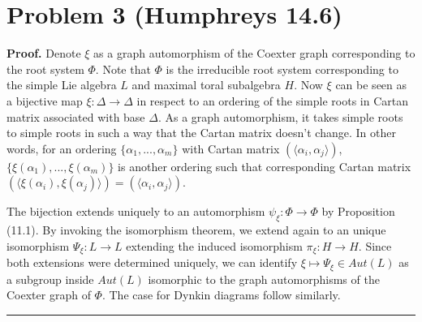 \documentclass[12pt]{article}%
\newenvironment{proof}[1][Proof]{\textbf{#1.} }{\ \rule{0.5em}{0.5em}}
\begin{document}
\section*{Problem 3 (Humphreys 14.6)}
\begin{proof}
  Denote $\xi$ as a graph automorphism of the Coexter graph corresponding to the root system $\Phi$. Note that $\Phi$ is the irreducible root system corresponding to the simple Lie algebra $L$ and maximal toral subalgebra $H$. Now $\xi$ can be seen as a bijective map $\xi:\Delta \rightarrow \Delta$ in respect to an ordering of the simple roots in Cartan matrix associated with base $\Delta$. As a graph automorphism, it takes simple roots to simple roots in such a way that the Cartan matrix doesn't change. In other words, for an ordering $\{\alpha_1,...,\alpha_m\}$ with Cartan matrix $(\langle \alpha_i,\alpha_j \rangle)$, $\{\xi(\alpha_1),...,\xi(\alpha_m)\}$ is another ordering such that corresponding Cartan matrix $(\langle \xi(\alpha_i),\xi(\alpha_j) \rangle) = (\langle \alpha_i,\alpha_j \rangle)$. \newline

  The bijection extends uniquely to an automorphism $\psi_{\xi}: \Phi \rightarrow \Phi$ by Proposition (11.1). By invoking the isomorphism theorem, we extend again to an unique isomorphism $\Psi_{\xi}: L \rightarrow L$ extending the induced isomorphism $\pi_{\xi}: H \rightarrow H$. Since both extensions were determined uniquely, we can identify  $\xi \mapsto \Psi_{\xi} \in Aut(L)$ as a subgroup inside $Aut(L)$ isomorphic to the graph automorphisms of the Coexter graph of $\Phi$. The case for Dynkin diagrams follow similarly.
\end{proof}
\end{document}
